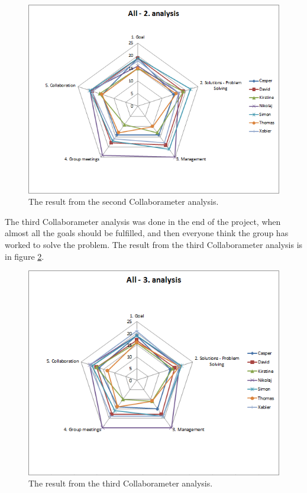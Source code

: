 \begin{figure}[h]
\centering
\includegraphics[width=0.7\linewidth]{./graphics/2analysisCollaborameter}
\caption{The result from the second Collaborameter analysis.}
\label{fig:2analysisCollaborameter}
\end{figure}

The third Collaborameter analysis was done in the end of the project, when almost all the goals should be fulfilled, and then everyone think the group has worked to solve the problem. The result from the third Collaborameter analysis is in figure \ref{fig:3analysisCollaborameter}.

\begin{figure}
\centering
\includegraphics[width=0.7\linewidth]{./graphics/3analysisCollaborameter}
\caption{The result from the third Collaborameter analysis.}
\label{fig:3analysisCollaborameter}
\end{figure}


